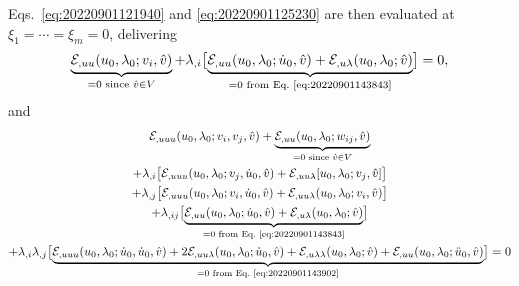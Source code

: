 \documentclass[12pt, final]{scrartcl}
\theoremstyle{definition}
\newcommand{\E}{\mathcal E}
\begin{document}
Eqs.~\eqref{eq:20220901121940} and \eqref{eq:20220901125230} are then evaluated
at $\xi_1 = \cdots = \xi_m = 0$, delivering
\begin{equation}
  \label{eq:20220901152056}
  \underbrace{\E_{,uu}(u_0, \lambda_0; v_i, \hat{v})}_{=0 \text{ since } \hat{v} \in V}
  + \lambda_{, i} \bigl[ \underbrace{\E_{,uu}(u_0, \lambda_0; \dot{u}_0, \hat{v}) +  \E_{,u\lambda}(u_0, \lambda_0; \hat{v})}_{ = 0 \text{ from Eq.~\eqref{eq:20220901143843}}} \bigr] = 0,
\end{equation}
and
\begin{equation}
  \label{eq:20220901152145}
  \begin{gathered}[b]
    \E_{,uuu}(u_0, \lambda_0; v_i , v_j, \hat{v}) + \underbrace{\E_{,uu}(u_0, \lambda_0; w_{ij}, \hat{v})}_{=0 \text{ since } \hat{v} \in V}\\
    +\lambda_{,i} \bigl[\E_{,uuu}(u_0, \lambda_0; v_j , \dot{u}_0, \hat{v}) + \E_{,uu\lambda}[u_0, \lambda_0; v_j, \hat{v}]\bigr]\\
    +\lambda_{,j} \bigl[\E_{,uuu}(u_0, \lambda_0; v_i , \dot{u}_0, \hat{v}) + \E_{,uu\lambda}(u_0, \lambda_0; v_i, \hat{v})\bigr]\\
    +\lambda_{,ij} \bigl[ \underbrace{\E_{,uu}(u_0, \lambda_0;  \dot{u}_0, \hat{v}) + \E_{,u\lambda}(u_0, \lambda_0; \hat{v})}_{ = 0 \text{ from Eq.~\eqref{eq:20220901143843}}} \bigr]\\
    +\lambda_{,i} \lambda_{,j}\bigl[ \underbrace{\E_{,uuu}(u_0, \lambda_0; \dot{u}_0 , \dot{u}_0, \hat{v}) + 2\E_{,uu\lambda}(u_0, \lambda_0; \dot{u}_0, \hat{v}) + \E_{,u\lambda\lambda}(u_0, \lambda_0; \hat{v}) + \E_{,uu}(u_0, \lambda_0; \ddot{u}_0, \hat{v})}_{ = 0 \text{ from Eq.~\eqref{eq:20220901143902}}} \bigr] = 0
  \end{gathered}
\end{equation}
\end{document}
